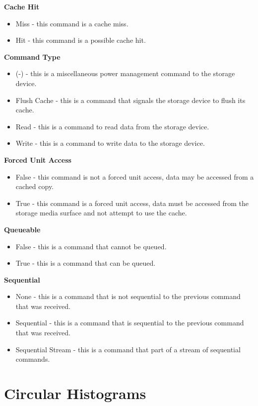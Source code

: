 \documentclass[12pt]{ucthesis}
\begin{document}
\noindent \textbf{Cache Hit}
\begin{itemize}
\item Miss - this command is a cache miss.
\item Hit - this command is a possible cache hit.
\end{itemize}

\noindent \textbf{Command Type}
\begin{itemize}
\item (-) - this is a miscellaneous power management command to the storage device.
\item Flush Cache - this is a command that signals the storage device to flush its cache.
\item Read - this is a command to read data from the storage device.
\item Write - this is a command to write data to the storage device.
\end{itemize}

\noindent \textbf{Forced Unit Access}
\begin{itemize}
\item False - this command is not a forced unit access, data may be accessed from a cached copy.
\item True - this command is a forced unit access, data must be accessed from the storage media surface and not attempt to use the cache.
\end{itemize}

\noindent \textbf{Queueable}
\begin{itemize}
\item False - this is a command that cannot be queued.
\item True - this is a command that can be queued.
\end{itemize}

\noindent \textbf{Sequential}
\begin{itemize}
\item None - this is a command that is not sequential to the previous command that was received.
\item Sequential - this is a command that is sequential to the previous command that was received.
\item Sequential Stream - this is a command that part of a stream of sequential commands.
\end{itemize}

\section{Circular Histograms}
\end{document}
